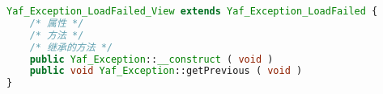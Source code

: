 \begin{lstlisting}[language=PHP]
Yaf_Exception_LoadFailed_View extends Yaf_Exception_LoadFailed {
    /* 属性 */
    /* 方法 */
    /* 继承的方法 */
    public Yaf_Exception::__construct ( void )
    public void Yaf_Exception::getPrevious ( void )
}
\end{lstlisting}

\begin{lstlisting}[language=PHP]

\end{lstlisting}




\begin{lstlisting}[language=PHP]

\end{lstlisting}



\begin{lstlisting}[language=PHP]

\end{lstlisting}

